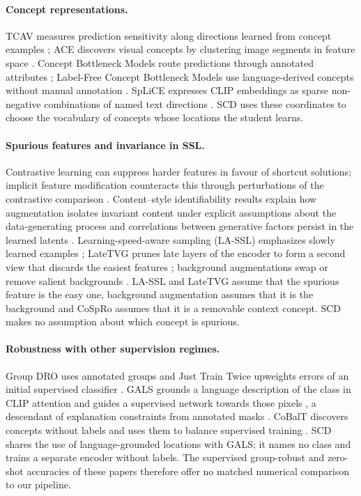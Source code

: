 \documentclass{article}
\begin{document}
\paragraph{Concept representations.}
TCAV measures prediction sensitivity along directions learned from concept examples \citep{kim2018tcav}; ACE discovers visual concepts by clustering image segments in feature space \citep{ghorbani2019ace}. Concept Bottleneck Models route predictions through annotated attributes \citep{koh2020cbm}; Label-Free Concept Bottleneck Models use language-derived concepts without manual annotation \citep{oikarinen2023lfcbm}. SpLiCE expresses CLIP embeddings as sparse non-negative combinations of named text directions \citep{bhalla2024splice}. SCD uses these coordinates to choose the vocabulary of concepts whose locations the student learns.

\paragraph{Spurious features and invariance in SSL.}
Contrastive learning can suppress harder features in favour of shortcut solutions; implicit feature modification counteracts this through perturbations of the contrastive comparison \citep{robinson2021shortcut}. Content--style identifiability results explain how augmentation isolates invariant content under explicit assumptions about the data-generating process \citep{vonkugelgen2021content} and correlations between generative factors persist in the learned latents \citep{trauble2021correlated}. Learning-speed-aware sampling (LA-SSL) emphasizes slowly learned examples \citep{zhu2023lassl}; LateTVG prunes late layers of the encoder to form a second view that discards the easiest features \citep{hamidieh2024latetvg}; background augmentations swap or remove salient backgrounds \citep{ryali2021background}. LA-SSL and LateTVG assume that the spurious feature is the easy one, background augmentation assumes that it is the background and CoSpRo assumes that it is a removable context concept. SCD makes no assumption about which concept is spurious.

\paragraph{Robustness with other supervision regimes.}
Group DRO uses annotated groups \citep{sagawa2020groupdro} and Just Train Twice upweights errors of an initial supervised classifier \citep{liu2021jtt}. GALS grounds a language description of the class in CLIP attention and guides a supervised network towards those pixels \citep{petryk2022gals}, a descendant of explanation constraints from annotated masks \citep{ross2017rrr}. CoBalT discovers concepts without labels and uses them to balance supervised training \citep{arefin2024cobalt}. SCD shares the use of language-grounded locations with GALS; it names no class and trains a separate encoder without labels. The supervised group-robust and zero-shot accuracies of these papers therefore offer no matched numerical comparison to our pipeline.
\end{document}
